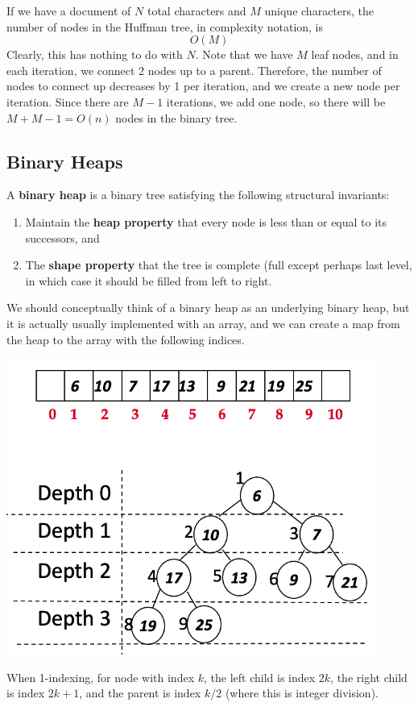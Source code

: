 \documentclass{article}
\begin{document}
    \begin{theorem}
    If we have a document of $N$ total characters and $M$ unique characters, the number of nodes in the Huffman tree, in complexity notation, is 
    \[O(M)\]
    Clearly, this has nothing to do with $N$. Note that we have $M$ leaf nodes, and in each iteration, we connect 2 nodes up to a parent. Therefore, the number of nodes to connect up decreases by 1 per iteration, and we create a new node per iteration. Since there are $M - 1$ iterations, we add one node, so there will be $M + M - 1 = O(n)$ nodes in the binary tree. 
    \end{theorem}

  \subsection{Binary Heaps}

    \begin{definition}
    A \textbf{binary heap} is a binary tree satisfying the following structural invariants: 
    \begin{enumerate}
        \item Maintain the \textbf{heap property} that every node is less than or equal to its successors, and 
        \item The \textbf{shape property} that the tree is complete (full except perhaps last level, in which case it should be filled from left to right. 
    \end{enumerate}
    We should conceptually think of a binary heap as an underlying binary heap, but it is actually usually implemented with an array, and we can create a map from the heap to the array with the following indices. 
    \begin{center}
        \includegraphics[scale=0.5]{img/binary_heap.png}
    \end{center}
    When 1-indexing, for node with index $k$, the left child is index $2k$, the right child is index $2k + 1$, and the parent is index $k/2$ (where this is integer division). 
    \end{definition}
\end{document}

